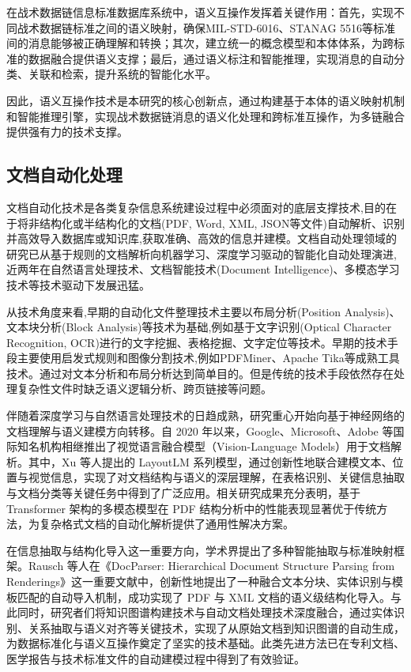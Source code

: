 在战术数据链信息标准数据库系统中，语义互操作发挥着关键作用：首先，实现不同战术数据链标准之间的语义映射，确保MIL-STD-6016、STANAG 5516等标准间的消息能够被正确理解和转换；其次，建立统一的概念模型和本体体系，为跨标准的数据融合提供语义支撑；最后，通过语义标注和智能推理，实现消息的自动分类、关联和检索，提升系统的智能化水平。

因此，语义互操作技术是本研究的核心创新点，通过构建基于本体的语义映射机制和智能推理引擎，实现战术数据链消息的语义化处理和跨标准互操作，为多链融合提供强有力的技术支撑。


\subsection{文档自动化处理}

文档自动化技术是各类复杂信息系统建设过程中必须面对的底层支撑技术,目的在于将非结构化或半结构化的文档(PDF, Word, XML, JSON等文件)自动解析、识别并高效导入数据库或知识库,获取准确、高效的信息并建模。文档自动处理领域的研究已从基于规则的文档解析向机器学习、深度学习驱动的智能化自动处理演进,近两年在自然语言处理技术、文档智能技术(Document Intelligence)、多模态学习技术等技术驱动下发展迅猛。

从技术角度来看,早期的自动化文件整理技术主要以布局分析(Position Analysis)、文本块分析(Block Analysis)等技术为基础,例如基于文字识别(Optical Character Recognition, OCR)进行的文字挖掘、表格挖掘、文字定位等技术。早期的技术手段主要使用启发式规则和图像分割技术,例如PDFMiner、Apache Tika等成熟工具技术。通过对文本分析和布局分析达到简单目的。但是传统的技术手段依然存在处理复杂性文件时缺乏语义逻辑分析、跨页链接等问题。

伴随着深度学习与自然语言处理技术的日趋成熟，研究重心开始向基于神经网络的文档理解与语义建模方向转移。自 2020 年以来，Google、Microsoft、Adobe 等国际知名机构相继推出了视觉语言融合模型（Vision-Language Models）用于文档解析。其中，Xu 等人提出的 LayoutLM 系列模型\cite{Xu2020LayoutLM,Huang2022LayoutLMv3}，通过创新性地联合建模文本、位置与视觉信息，实现了对文档结构与语义的深层理解，在表格识别、关键信息抽取与文档分类等关键任务中得到了广泛应用。相关研究成果充分表明，基于 Transformer 架构的多模态模型在 PDF 结构分析中的性能表现显著优于传统方法，为复杂格式文档的自动化解析提供了通用性解决方案。

在信息抽取与结构化导入这一重要方向，学术界提出了多种智能抽取与标准映射框架。Rausch 等人在《DocParser: Hierarchical Document Structure Parsing from Renderings》这一重要文献中\cite{Rausch2021DocParser}，创新性地提出了一种融合文本分块、实体识别与模板匹配的自动导入机制，成功实现了 PDF 与 XML 文档的语义级结构化导入。与此同时，研究者们将知识图谱构建技术与自动文档处理技术深度融合，通过实体识别、关系抽取与语义对齐等关键技术，实现了从原始文档到知识图谱的自动生成，为数据标准化与语义互操作奠定了坚实的技术基础。此类先进方法已在专利文档、医学报告与技术标准文件的自动建模过程中得到了有效验证。

